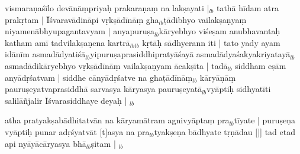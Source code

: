 \documentclass[article,12pt,a4paper]{memoir}%
\newcounter{parCount}
\begin{document}
	  
	  \pstart \leavevmode%
	vismaraṇaśīlo devānāṃpriyaḥ prakaraṇaṃ na lakṣayati |{\tiny $_{lb}$} tathā hīdam atra prakṛtam | Īśvaravādināpi vṛkṣādīnāṃ gha{\tiny $_{lb}$}ṭādibhyo vailakṣaṇyaṃ niyamenābhyupagantavyam | anyapuruṣa{\tiny $_{lb}$}kāryebhyo viśeṣam anubhavantaḥ katham amī tadvilakṣaṇena kartrā{\tiny $_{lb}$}{\tiny $_{lb}$} \leavevmode{} kṛtāḥ sādhyerann iti | tato yady ayam idānīm asmadādyatiśā{\tiny $_{lb}$}yipuruṣaprasiddhipratyāśayā asmadādyaśakyakri\leavevmode{}yatayā{\tiny $_{lb}$} asmadādikāryebhyo vṛkṣādīnāṃ vailakṣaṇyam ācakṣīta | tadā{\tiny $_{lb}$} siddham eṣām anyādṛśatvam | siddhe cānyādṛśatve na ghaṭādīnāṃ{\tiny $_{lb}$} kāryāṇāṃ pauruṣeyatvaprasiddhā sarvasya kāryasya pauruṣeyatā{\tiny $_{lb}$}vyāptiḥ sidhyatīti salilāñjalir Īśvarasiddhaye deyaḥ |
	{}
	\pend%
      {\tiny $_{lb}$}

	  
	  \pstart \leavevmode%
	atha pratyakṣabādhitatvān na kāryamātram agnivyāptaṃ pra{\tiny $_{lb}$}tīyate | puruṣeṇa vyāptiḥ punar adṛśyatvāt [t]asya na pra{\tiny $_{lb}$}tyakṣeṇa bādhyate tṛṇādau [|] tad etad api nyāyācāryasya bhā{\tiny $_{lb}$}ṣitam |
	{}
	\pend%
      {\tiny $_{lb}$}
\end{document}
